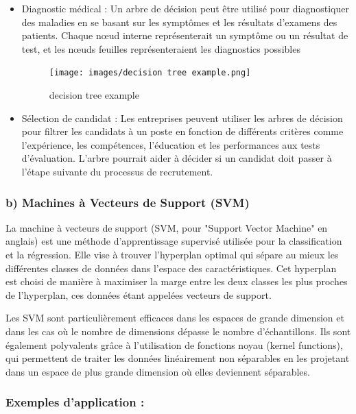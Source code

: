 \documentclass[a4paper,12pt]{report}
\begin{document}
            \begin{itemize}
                \item Diagnostic médical : Un arbre de décision peut être utilisé pour diagnostiquer des maladies en se basant sur les symptômes et les résultats d'examens des patients. Chaque nœud interne représenterait un symptôme ou un résultat de test, et les nœuds feuilles représenteraient les diagnostics possibles

                 \begin{figure}[h]
                    \centering
                    \texttt{[image: images/decision tree example.png]}
                    \caption{decision tree example}
                    \label{fig:decision tree example}
                \end{figure}
                \item Sélection de candidat : Les entreprises peuvent utiliser les arbres de décision pour filtrer les candidats à un poste en fonction de différents critères comme l'expérience, les compétences, l'éducation et les performances aux tests d'évaluation. L'arbre pourrait aider à décider si un candidat doit passer à l'étape suivante du processus de recrutement.
            \end{itemize}
            
        \subsubsection*{b) Machines à Vecteurs de Support (SVM)}
        La machine à vecteurs de support (SVM, pour "Support Vector Machine" en anglais) est une méthode d'apprentissage supervisé utilisée pour la classification et la régression. Elle vise à trouver l'hyperplan optimal qui sépare au mieux les différentes classes de données dans l'espace des caractéristiques. Cet hyperplan est choisi de manière à maximiser la marge entre les deux classes les plus proches de l'hyperplan, ces données étant appelées vecteurs de support.
        
        Les SVM sont particulièrement efficaces dans les espaces de grande dimension et dans les cas où le nombre de dimensions dépasse le nombre d'échantillons. Ils sont également polyvalents grâce à l'utilisation de fonctions noyau (kernel functions), qui permettent de traiter les données linéairement non séparables en les projetant dans un espace de plus grande dimension où elles deviennent séparables.
        
        \subsubsection{Exemples d'application :}
        
\end{document}
